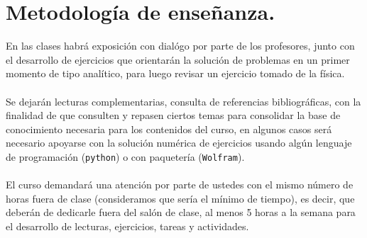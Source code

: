 \documentclass[12pt]{article}
\begin{document}
\section{Metodología de enseñanza.}
En las clases habrá exposición con dialógo por parte de los profesores, junto con el desarrollo de ejercicios que orientarán la solución de problemas en un primer momento de tipo analítico, para luego revisar un ejercicio tomado de la física.
\\
\\
Se dejarán lecturas complementarias, consulta de referencias bibliográficas, con la finalidad de que consulten y repasen ciertos temas para consolidar la base de conocimiento necesaria para los contenidos del curso, en algunos casos será necesario apoyarse con la solución numérica de ejercicios usando algún lenguaje de programación (\texttt{python}) o con paquetería (\texttt{Wolfram}).
\\
\\
El curso demandará una atención por parte de ustedes con el mismo número de horas fuera de clase (consideramos que sería el mínimo de tiempo), es decir, que deberán de dedicarle fuera del salón de clase, al menos 5 horas a la semana para el desarrollo de lecturas, ejercicios, tareas y actividades.
\end{document}

